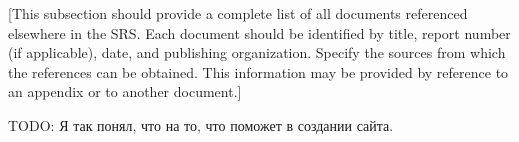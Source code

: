 [This subsection should provide a complete list 
of all documents referenced elsewhere in the SRS.
Each document should be identified by title, 
report number (if applicable), date, and publishing
organization.  Specify the sources from which the 
references can be obtained. This information may be 
provided by reference to an appendix or to another 
document.]

TODO: Я так понял, что на то, что поможет в 
создании сайта.
